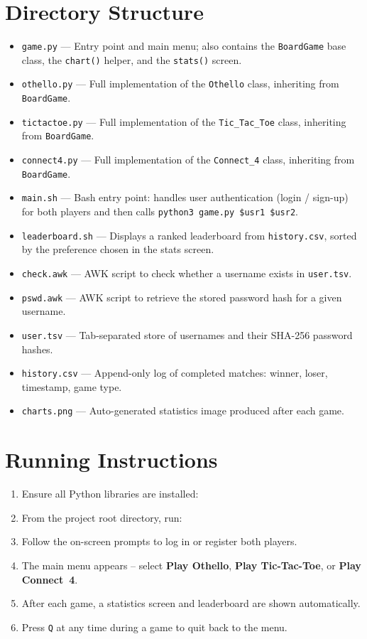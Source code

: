 \documentclass[12pt]{article}
\begin{document}
\section{Directory Structure}
 
\begin{itemize}
    \item \texttt{game.py} --- Entry point and main menu; also contains the \texttt{BoardGame} base class, the \texttt{chart()} helper, and the \texttt{stats()} screen.
    \item \texttt{othello.py} --- Full implementation of the \texttt{Othello} class, inheriting from \texttt{BoardGame}.
    \item \texttt{tictactoe.py} --- Full implementation of the \texttt{Tic\_Tac\_Toe} class, inheriting from \texttt{BoardGame}.
    \item \texttt{connect4.py} --- Full implementation of the \texttt{Connect\_4} class, inheriting from \texttt{BoardGame}.
    \item \texttt{main.sh} --- Bash entry point: handles user authentication (login / sign-up) for both players and then calls \texttt{python3 game.py \$usr1 \$usr2}.
    \item \texttt{leaderboard.sh} --- Displays a ranked leaderboard from \texttt{history.csv}, sorted by the preference chosen in the stats screen.
    \item \texttt{check.awk} --- AWK script to check whether a username exists in \texttt{user.tsv}.
    \item \texttt{pswd.awk} --- AWK script to retrieve the stored password hash for a given username.
    \item \texttt{user.tsv} --- Tab-separated store of usernames and their SHA-256 password hashes.
    \item \texttt{history.csv} --- Append-only log of completed matches: winner, loser, timestamp, game type.
    \item \texttt{charts.png} --- Auto-generated statistics image produced after each game.
\end{itemize}
 
\section{Running Instructions}
 
\begin{enumerate}
    \item Ensure all Python libraries are installed:
    \item From the project root directory, run:
    \item Follow the on-screen prompts to log in or register both players.
    \item The main menu appears -- select \textbf{Play Othello}, \textbf{Play Tic-Tac-Toe}, or \textbf{Play Connect~4}.
    \item After each game, a statistics screen and leaderboard are shown automatically.
    \item Press \texttt{Q} at any time during a game to quit back to the menu.
\end{enumerate}
 
\end{document}
